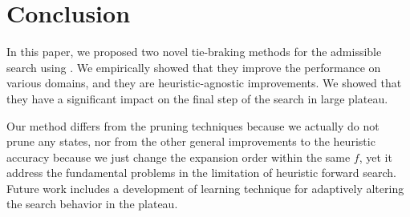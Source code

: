\section{Conclusion}

In this paper, we proposed two novel tie-braking methods for the admissible search using \astar. We empirically showed that they improve the performance on various domains, and they are heuristic-agnostic improvements. We showed that they have a significant impact on the final step of the search in large plateau.

Our method differs from the pruning techniques because we actually
do not prune any states, nor from the other general improvements to the
heuristic accuracy because we just change the expansion order within the
same $f$, yet it address the fundamental problems in the limitation of
heuristic forward search.  Future work includes a development of learning
technique for adaptively altering the search behavior in the plateau.



